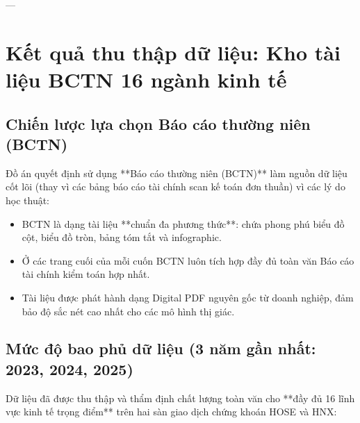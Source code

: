 \documentclass[a4paper,12pt]{article}
\begin{document}
---

\section{Kết quả thu thập dữ liệu: Kho tài liệu BCTN 16 ngành kinh tế}

\subsection{Chiến lược lựa chọn Báo cáo thường niên (BCTN)}
Đồ án quyết định sử dụng **Báo cáo thường niên (BCTN)** làm nguồn dữ liệu cốt lõi (thay vì các bảng báo cáo tài chính scan kế toán đơn thuần) vì các lý do học thuật:
\begin{itemize}
    \item BCTN là dạng tài liệu **chuẩn đa phương thức**: chứa phong phú biểu đồ cột, biểu đồ tròn, bảng tóm tắt và infographic.
    \item Ở các trang cuối của mỗi cuốn BCTN luôn tích hợp đầy đủ toàn văn Báo cáo tài chính kiểm toán hợp nhất.
    \item Tài liệu được phát hành dạng Digital PDF nguyên gốc từ doanh nghiệp, đảm bảo độ sắc nét cao nhất cho các mô hình thị giác.
\end{itemize}

\subsection{Mức độ bao phủ dữ liệu (3 năm gần nhất: 2023, 2024, 2025)}
Dữ liệu đã được thu thập và thẩm định chất lượng toàn văn cho **đầy đủ 16 lĩnh vực kinh tế trọng điểm** trên hai sàn giao dịch chứng khoán HOSE và HNX:
\end{document}

